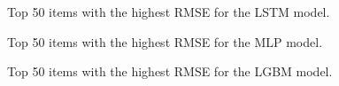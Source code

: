\clearpage
\begin{figure}
    \centering
    \caption{Top 50 items with the highest RMSE for the LSTM model.}
    \label{fig:lstm_worst}
\end{figure}

\begin{figure}
    \centering
    \caption{Top 50 items with the highest RMSE for the MLP model.}
    \label{fig:ann_worst}
\end{figure}

\begin{figure}
    \centering
    \caption{Top 50 items with the highest RMSE for the LGBM model.}
    \label{fig:lgbm_worst}
\end{figure}

